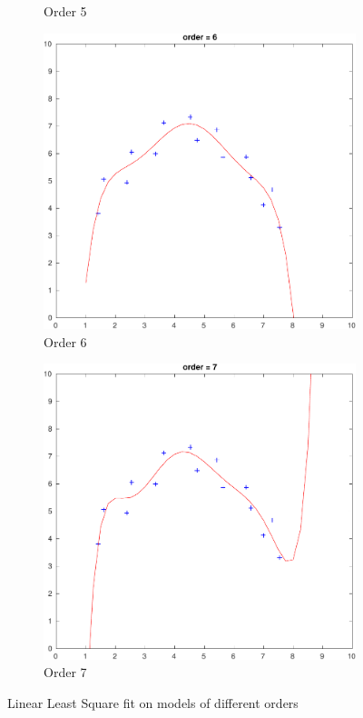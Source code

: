 \begin{figure}[htbp]
\begin{subfigure}[t]{0.42\textwidth}
		\caption{Order 5}\label{fig:1c}
	\end{subfigure}
	\begin{subfigure}[t]{0.42\textwidth}
		\centering
		\includegraphics[width=\textwidth]{hw1/problem1/f4.pdf}
		\caption{Order 6}\label{fig:1d}
	\end{subfigure}
	\quad
	\begin{subfigure}[t]{0.42\textwidth}
		\centering
		\includegraphics[width=\textwidth]{hw1/problem1/f5.pdf}
		\caption{Order 7}\label{fig:1e}
	\end{subfigure}
	\caption{Linear Least Square fit on models of different orders}\label{fig:1}
\end{figure}



